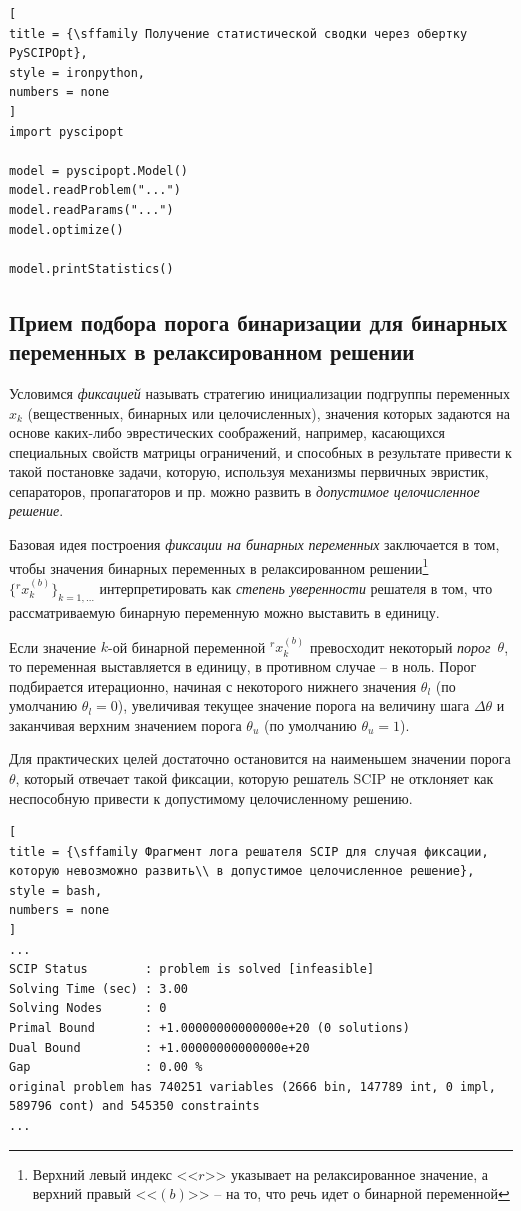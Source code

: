 \documentclass[%
	11pt,
	a4paper,
	utf8,
		]{article}
\begin{document}
\begin{lstlisting}[
title = {\sffamily Получение статистической сводки через обертку PySCIPOpt},
style = ironpython,
numbers = none
]
import pyscipopt

model = pyscipopt.Model()
model.readProblem("...")
model.readParams("...")
model.optimize()

model.printStatistics()
\end{lstlisting}





\subsection{Прием подбора порога бинаризации для бинарных переменных в релаксированном решении}\label{sec:find_bin_thresh}

Условимся \emph{фиксацией} называть стратегию инициализации подгруппы переменных $ x_k $ (вещественных, бинарных или целочисленных), значения которых задаются на основе каких-либо эврестических соображений, например, касающихся специальных свойств матрицы ограничений, и способных в результате привести к такой постановке задачи, которую, используя механизмы первичных эвристик, сепараторов, пропагаторов и пр. можно развить в \emph{допустимое целочисленное решение}.

Базовая идея построения \emph{фиксации на бинарных переменных} заключается в том, чтобы значения бинарных переменных в релаксированном решении\footnote{Верхний левый индекс <<$ r $>> указывает на релаксированное значение, а верхний правый <<$ (b) $>> -- на то, что речь идет о бинарной переменной} $ {\{{}^rx^{(b)}_k\}}_{k=1, \ldots} $ интерпретировать как \emph{степень уверенности} решателя в том, что рассматриваемую бинарную переменную можно выставить в единицу.

Если значение $ k $-ой бинарной переменной $ {}^rx_k^{(b)}$ превосходит некоторый \emph{порог}~$ \theta $, то переменная выставляется в единицу, в противном случае -- в ноль. Порог подбирается итерационно, начиная с некоторого нижнего значения $ \theta_l $ (по умолчанию $ \theta_l = 0 $), увеличивая текущее значение порога на величину шага $ \Delta \theta $ и заканчивая верхним значением порога $ \theta_u $ (по умолчанию $ \theta_u = 1 $).

Для практических целей достаточно остановится на наименьшем значении порога $ \theta $, который отвечает такой фиксации, которую решатель SCIP не отклоняет как неспособную привести к допустимому целочисленному решению.
\begin{lstlisting}[
title = {\sffamily Фрагмент лога решателя SCIP для случая фиксации, которую невозможно развить\\ в допустимое целочисленное решение},
style = bash,
numbers = none	
]
...
SCIP Status        : problem is solved [infeasible]
Solving Time (sec) : 3.00
Solving Nodes      : 0
Primal Bound       : +1.00000000000000e+20 (0 solutions)
Dual Bound         : +1.00000000000000e+20
Gap                : 0.00 %
original problem has 740251 variables (2666 bin, 147789 int, 0 impl, 589796 cont) and 545350 constraints
...
\end{lstlisting}
\end{document}
